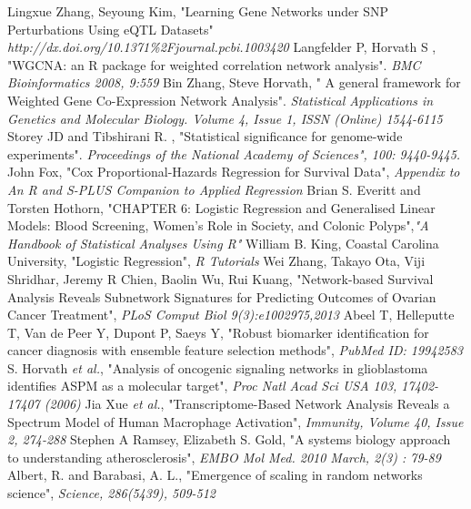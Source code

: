 \documentclass{ba-kecs}
\numberwithin{figure}{section}
\numberwithin{equation}{section}
\begin{document}
\begin{thebibliography}{99}
 Lingxue Zhang, Seyoung Kim, "Learning Gene Networks under SNP Perturbations Using eQTL Datasets" \emph{http://dx.doi.org/10.1371\%2Fjournal.pcbi.1003420}
 Langfelder P, Horvath S , "WGCNA: an R package for weighted correlation network analysis". \emph{BMC Bioinformatics 2008, 9:559}
 Bin Zhang, Steve Horvath, " A general framework for Weighted Gene Co-Expression Network Analysis". \emph{Statistical Applications in Genetics and Molecular Biology. Volume 4, Issue 1, ISSN (Online) 1544-6115}
 Storey JD and Tibshirani R. , "Statistical significance for genome-wide experiments".\emph{ Proceedings of the National Academy of Sciences", 100: 9440-9445.}
 John Fox, "Cox Proportional-Hazards Regression for Survival Data", \emph{Appendix to An R and S-PLUS Companion to Applied Regression}
 Brian S. Everitt and Torsten Hothorn, "CHAPTER 6: Logistic Regression and Generalised Linear Models: Blood Screening, Women’s Role in Society, and Colonic Polyps",\emph{"A Handbook of Statistical Analyses Using R"}
 William B. King, Coastal Carolina University, "Logistic Regression", \emph{R Tutorials} 
 Wei Zhang, Takayo Ota, Viji Shridhar, Jeremy R Chien, Baolin Wu, Rui Kuang, "Network-based Survival Analysis Reveals Subnetwork Signatures for Predicting Outcomes of Ovarian Cancer Treatment", \emph{PLoS Comput Biol 9(3):e1002975,2013}
 Abeel T, Helleputte T, Van de Peer Y, Dupont P, Saeys Y, "Robust biomarker identification for cancer diagnosis with ensemble feature selection methods", \emph{PubMed ID: 19942583}
 S. Horvath \emph{et al.}, "Analysis of oncogenic signaling networks in glioblastoma identifies ASPM as a molecular target", \emph{Proc Natl Acad Sci USA 103, 17402-17407 (2006)}
 Jia Xue \emph{et al.}, "Transcriptome-Based Network Analysis Reveals a Spectrum Model of Human Macrophage Activation", \emph{Immunity, Volume 40, Issue 2, 274-288}
 Stephen A Ramsey, Elizabeth S. Gold, "A systems biology approach to understanding atherosclerosis", \emph{EMBO Mol Med. 2010 March, 2(3) : 79-89}
 Albert, R. and Barabasi, A. L., "Emergence of scaling in random networks science", \emph{Science, 286(5439), 509-512}
\end{thebibliography}

\appendix
\end{document}
